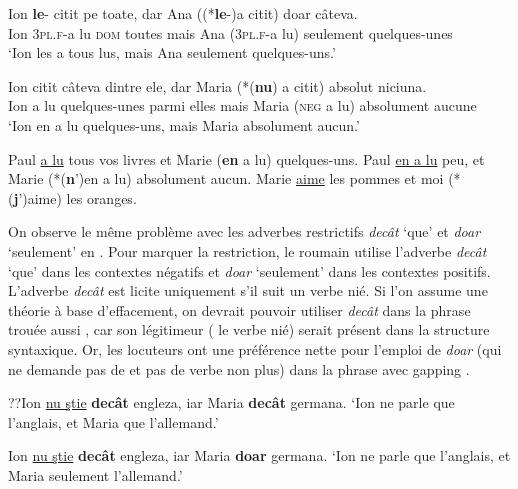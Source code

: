\ea
\ea 
\gll Ion  \textbf{le}{}-  citit  pe  toate,  dar  Ana  ((*\textbf{le}{}-)a  citit)  doar  câteva. \label{ch2:ex235a}\\
Ion \textsc{3pl.f}-a lu \textsc{dom} toutes  mais  Ana  (\textsc{3pl.f}-a  lu)  seulement  quelques-unes\\
\glt ‘Ion les a tous lus, mais Ana seulement quelques-uns.’

\ex  
\gll Ion  citit  câteva  dintre  ele,  dar  Maria  (*(\textbf{nu})  a  citit)  absolut niciuna. \label{ch2:ex235b}\\
Ion  a  lu  quelques-unes  parmi  elles  mais  Maria  (\textsc{neg} a  lu)  absolument aucune\\
\glt ‘Ion en a lu quelques-uns, mais Maria absolument aucun.’ 
\z
\z


\ea
\ea Paul \uline{a lu} tous vos livres et Marie (\textbf{en} a lu) quelques-uns. \label{ch2:ex236a}      
\ex Paul \uline{en a lu} peu, et Marie (*(\textbf{n}’)en a lu) absolument aucun. \label{ch2:ex236b}
\ex Marie \uline{aime} les pommes et moi (*(\textbf{j}’)aime) les oranges. \label{ch2:ex236c}
\z
\z

On observe le même problème avec les adverbes restrictifs \textit{decât} ‘que’ et \textit{doar} ‘seulement’ en . Pour marquer la restriction, le roumain utilise l’adverbe \textit{decât} ‘que’ dans les contextes négatifs et \textit{doar} ‘seulement’ dans les contextes positifs. L’adverbe \textit{decât} est licite uniquement s’il suit un verbe nié. Si l’on assume une théorie à base d’effacement, on devrait pouvoir utiliser \textit{decât} dans la phrase trouée aussi , car son légitimeur ({\cad} le verbe nié) serait présent dans la structure syntaxique. Or, les locuteurs ont une préférence nette pour l’emploi de \textit{doar} (qui ne demande pas de  et pas de verbe non plus) dans la phrase avec gapping . 

\ea \label{ch2:ex237}
\ea ??Ion \uline{nu ştie} \textbf{decât} engleza, iar Maria \textbf{decât} germana. \label{ch2:ex237a}
\glt ‘Ion ne parle que l’anglais, et Maria que l’allemand.’

\ex Ion \uline{nu ştie} \textbf{decât} engleza, iar Maria \textbf{doar} germana. \label{ch2:ex237b}
\glt ‘Ion ne parle que l’anglais, et Maria seulement l’allemand.' 
\z
\z

